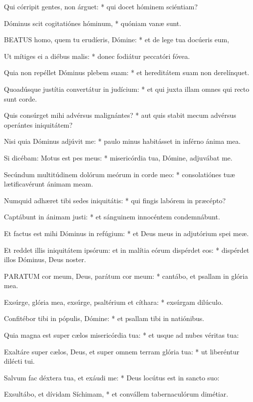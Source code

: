 Qui córripit gentes, non árguet: * qui docet hóminem sciéntiam?

Dóminus scit cogitatiónes hóminum, * quóniam vanæ sunt.


\lettrine[lines=2]{B}{EATUS} homo, quem tu erudíeris, Dómine: * et de lege tua docúeris eum,

Ut mítiges ei a diébus malis: * donec fodiátur peccatóri fóvea.

Quia non repéllet Dóminus plebem suam: * et hereditátem suam non derelínquet.

Quoadúsque justítia convertátur in judícium: * et qui juxta illam omnes qui recto sunt corde.

Quis consúrget mihi advérsus malignántes? * aut quis stabit mecum advérsus operántes iniquitátem?

Nisi quia Dóminus adjúvit me: * paulo minus habitásset in inférno ánima mea.

Si dicébam: Motus est pes meus: * misericórdia tua, Dómine, adjuvábat me.

Secúndum multitúdinem dolórum meórum in corde meo: * consolatiónes tuæ lætificavérunt ánimam meam.

Numquid adhæret tibi sedes iniquitátis: * qui fingis labórem in præcépto?

Captábunt in ánimam justi: * et sánguinem innocéntem condemnábunt.

Et factus est mihi Dóminus in refúgium: * et Deus meus in adjutórium spei meæ.

Et reddet illis iniquitátem ipsórum: et in malítia eórum dispérdet eos: * dispérdet illos Dóminus, Deus noster.


\lettrine[lines=2]{P}{ARATUM} cor meum, Deus, parátum cor meum: * cantábo, et psallam in glória mea.

Exsúrge, glória mea, exsúrge, psaltérium et cíthara: * exsúrgam dilúculo.

Confitébor tibi in pópulis, Dómine: * et psallam tibi in natiónibus.

Quia magna est super cælos misericórdia tua: * et usque ad nubes véritas tua:

Exaltáre super cælos, Deus, et super omnem terram glória tua: * ut liberéntur dilécti tui.

Salvum fac déxtera tua, et exáudi me: * Deus locútus est in sancto suo:

Exsultábo, et dívidam Síchimam, * et convállem tabernaculórum dimétiar.

